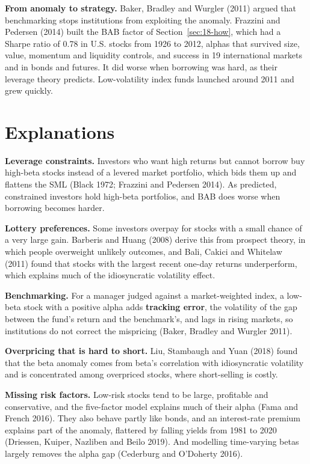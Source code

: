 \textbf{From anomaly to strategy.} Baker, Bradley and Wurgler (2011) argued that benchmarking stops institutions from exploiting the anomaly. Frazzini and Pedersen (2014) built the BAB factor of Section~\ref{sec:18-how}, which had a Sharpe ratio of 0.78 in U.S. stocks from 1926 to 2012, alphas that survived size, value, momentum and liquidity controls, and success in 19 international markets and in bonds and futures. It did worse when borrowing was hard, as their leverage theory predicts. Low-volatility index funds launched around 2011 and grew quickly.

\section{Explanations}
\label{sec:18-explanations}

\textbf{Leverage constraints.} Investors who want high returns but cannot borrow buy high-beta stocks instead of a levered market portfolio, which bids them up and flattens the SML (Black 1972; Frazzini and Pedersen 2014). As predicted, constrained investors hold high-beta portfolios, and BAB does worse when borrowing becomes harder.

\textbf{Lottery preferences.} Some investors overpay for stocks with a small chance of a very large gain. Barberis and Huang (2008) derive this from prospect theory, in which people overweight unlikely outcomes, and Bali, Cakici and Whitelaw (2011) found that stocks with the largest recent one-day returns underperform, which explains much of the idiosyncratic volatility effect.

\textbf{Benchmarking.} For a manager judged against a market-weighted index, a low-beta stock with a positive alpha adds \textbf{tracking error}, the volatility of the gap between the fund's return and the benchmark's, and lags in rising markets, so institutions do not correct the mispricing (Baker, Bradley and Wurgler 2011).

\textbf{Overpricing that is hard to short.} Liu, Stambaugh and Yuan (2018) found that the beta anomaly comes from beta's correlation with idiosyncratic volatility and is concentrated among overpriced stocks, where short-selling is costly.

\textbf{Missing risk factors.} Low-risk stocks tend to be large, profitable and conservative, and the five-factor model explains much of their alpha (Fama and French 2016). They also behave partly like bonds, and an interest-rate premium explains part of the anomaly, flattered by falling yields from 1981 to 2020 (Driessen, Kuiper, Nazliben and Beilo 2019). And modelling time-varying betas largely removes the alpha gap (Cederburg and O'Doherty 2016).

